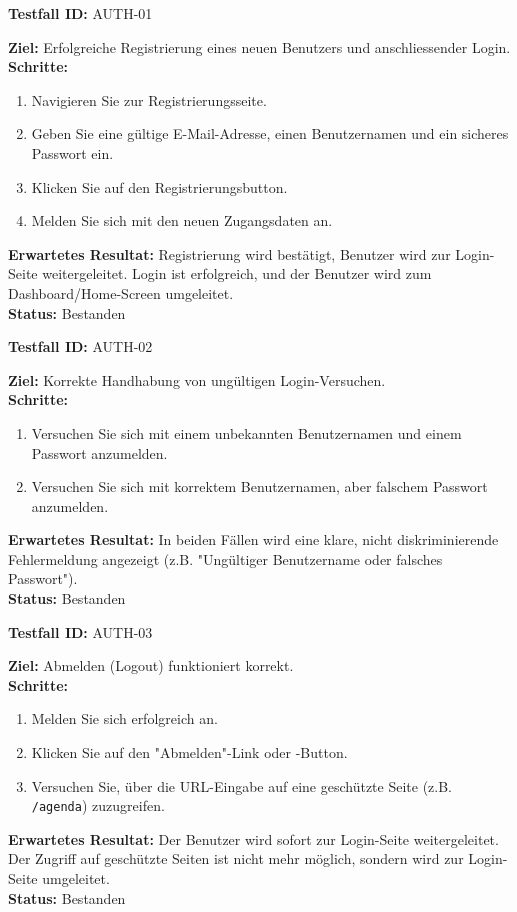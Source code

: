 \documentclass[11pt, a4paper]{article}
\newenvironment{testcase}[1]{%
    \par\vspace{1em}\noindent\begin{minipage}{\linewidth}
    \textbf{Testfall ID:} #1 \\
    \vspace{0.2em}
}{\end{minipage}\par\vspace{1em}}
\begin{document}
\begin{testcase}{AUTH-01}
    \textbf{Ziel:} Erfolgreiche Registrierung eines neuen Benutzers und anschliessender Login.\\
    \textbf{Schritte:}
    \begin{enumerate}[label=\arabic*.]
        \item Navigieren Sie zur Registrierungsseite.
        \item Geben Sie eine gültige E-Mail-Adresse, einen Benutzernamen und ein sicheres Passwort ein.
        \item Klicken Sie auf den Registrierungsbutton.
        \item Melden Sie sich mit den neuen Zugangsdaten an.
    \end{enumerate}
    \textbf{Erwartetes Resultat:} Registrierung wird bestätigt, Benutzer wird zur Login-Seite weitergeleitet. Login ist erfolgreich, und der Benutzer wird zum Dashboard/Home-Screen umgeleitet.\\
    \vspace{0.5em}\textbf{Status:} \textcolor{passcolor}{Bestanden}
\end{testcase}

\begin{testcase}{AUTH-02}
    \textbf{Ziel:} Korrekte Handhabung von ungültigen Login-Versuchen.\\
    \textbf{Schritte:}
    \begin{enumerate}[label=\arabic*.]
        \item Versuchen Sie sich mit einem unbekannten Benutzernamen und einem Passwort anzumelden.
        \item Versuchen Sie sich mit korrektem Benutzernamen, aber falschem Passwort anzumelden.
    \end{enumerate}
    \textbf{Erwartetes Resultat:} In beiden Fällen wird eine klare, nicht diskriminierende Fehlermeldung angezeigt (z.B. "Ungültiger Benutzername oder falsches Passwort").\\
    \vspace{0.5em}\textbf{Status:} \textcolor{passcolor}{Bestanden}
\end{testcase}

\begin{testcase}{AUTH-03}
    \textbf{Ziel:} Abmelden (Logout) funktioniert korrekt.\\
    \textbf{Schritte:}
    \begin{enumerate}[label=\arabic*.]
        \item Melden Sie sich erfolgreich an.
        \item Klicken Sie auf den "Abmelden"-Link oder -Button.
        \item Versuchen Sie, über die URL-Eingabe auf eine geschützte Seite (z.B. \texttt{/agenda}) zuzugreifen.
    \end{enumerate}
    \textbf{Erwartetes Resultat:} Der Benutzer wird sofort zur Login-Seite weitergeleitet. Der Zugriff auf geschützte Seiten ist nicht mehr möglich, sondern wird zur Login-Seite umgeleitet.\\
    \vspace{0.5em}\textbf{Status:} \textcolor{passcolor}{Bestanden}
\end{testcase}
\end{document}
